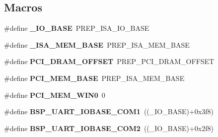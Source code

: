 \subsection*{Macros}
\begin{DoxyCompactItemize}
\item 
\mbox{\label{group__RTEMSBSPsPowerPCMotorola_gabb10b3234ab8ab0c01ae7bf8e75d9031}} 
\#define {\bfseries \+\_\+\+I\+O\+\_\+\+B\+A\+SE}~P\+R\+E\+P\+\_\+\+I\+S\+A\+\_\+\+I\+O\+\_\+\+B\+A\+SE
\item 
\mbox{\label{group__RTEMSBSPsPowerPCMotorola_gafb361508ea9f0a1130968b947c23914e}} 
\#define {\bfseries \+\_\+\+I\+S\+A\+\_\+\+M\+E\+M\+\_\+\+B\+A\+SE}~P\+R\+E\+P\+\_\+\+I\+S\+A\+\_\+\+M\+E\+M\+\_\+\+B\+A\+SE
\item 
\mbox{\label{group__RTEMSBSPsPowerPCMotorola_ga6d9f8ace1e46327132d0a991c6785b40}} 
\#define {\bfseries P\+C\+I\+\_\+\+D\+R\+A\+M\+\_\+\+O\+F\+F\+S\+ET}~P\+R\+E\+P\+\_\+\+P\+C\+I\+\_\+\+D\+R\+A\+M\+\_\+\+O\+F\+F\+S\+ET
\item 
\mbox{\label{group__RTEMSBSPsPowerPCMotorola_ga4780c0ef836bde00880830140efb1024}} 
\#define {\bfseries P\+C\+I\+\_\+\+M\+E\+M\+\_\+\+B\+A\+SE}~P\+R\+E\+P\+\_\+\+I\+S\+A\+\_\+\+M\+E\+M\+\_\+\+B\+A\+SE
\item 
\mbox{\label{group__RTEMSBSPsPowerPCMotorola_ga058f90eef08320f95ac045ad81cf5e5a}} 
\#define {\bfseries P\+C\+I\+\_\+\+M\+E\+M\+\_\+\+W\+I\+N0}~0
\item 
\mbox{\label{group__RTEMSBSPsPowerPCMotorola_gab259f83c40cdf929716d93a04b510006}} 
\#define {\bfseries B\+S\+P\+\_\+\+U\+A\+R\+T\+\_\+\+I\+O\+B\+A\+S\+E\+\_\+\+C\+O\+M1}~((\+\_\+\+I\+O\+\_\+\+B\+A\+SE)+0x3f8)
\item 
\mbox{\label{group__RTEMSBSPsPowerPCMotorola_ga2475131339f3941237ce2f311cdc4492}} 
\#define {\bfseries B\+S\+P\+\_\+\+U\+A\+R\+T\+\_\+\+I\+O\+B\+A\+S\+E\+\_\+\+C\+O\+M2}~((\+\_\+\+I\+O\+\_\+\+B\+A\+SE)+0x2f8)
\item 
\mbox{\label{group__RTEMSBSPsPowerPCMotorola_ga659b47b64fce5d840446d4f3c44eb138}} 

\end{DoxyCompactItemize}
